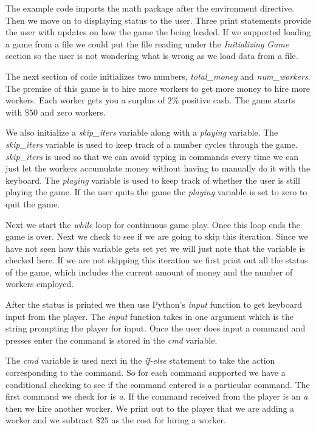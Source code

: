 The example code imports the math package after the environment directive. Then we move on to displaying status to the user. Three print statements provide the user with updates on how the game the being loaded. If we supported loading a game from a file we could put the file reading under the \emph{Initializing Game} section so the user is not wondering what is wrong as we load data from a file. 

The next section of code initializes two numbers, \emph{total\_money} and \emph{num\_workers}. The premise of this game is to hire more workers to get more money to hire more workers. Each worker gets you a surplus of $2\%$ positive cash. The game starts with $\$50$ and zero workers. 

We also initialize a \emph{skip\_iters} variable along with a \emph{playing} variable. The \emph{skip\_iters} variable is used to keep track of a number cycles through the game. \emph{skip\_iters} is used so that we can avoid typing in commands every time we can just let the workers accumulate money without having to manually do it with the keyboard. The \emph{playing} variable is used to keep track of whether the user is still playing the game. If the user quits the game the \emph{playing} variable is set to zero to quit the game. 

Next we start the \emph{while} loop for continuous game play. Once this loop ends the game is over. Next we check to see if we are going to skip this iteration. Since we have not seen how this variable gets set yet we will just note that the variable is checked here. If we are not skipping this iteration we first print out all the status of the game, which includes the current amount of money and the number of workers employed. 

After the status is printed we then use Python's \emph{input} function to get keyboard input from the player. The \emph{input} function takes in one argument which is the string prompting the player for input. Once the user does input a command and presses enter the command is stored in the \emph{cmd} variable. 

The \emph{cmd} variable is used next in the \emph{if-else} statement to take the action corresponding to the command. So for each command supported we have a conditional checking to see if the command entered is a particular command. The first command we check for is \emph{a}. If the command received from the player is an \emph{a} then we hire another worker. We print out to the player that we are adding a worker and we subtract $\$25$ as the cost for hiring a worker. 

